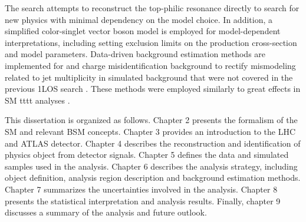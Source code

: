 \documentclass[../thesis.tex]{subfiles}
\begin{document}
The search attempts to reconstruct the top-philic resonance directly to search for new physics with minimal dependency on the model choice. In addition, a simplified color-singlet vector boson model \citep{theory:ttZp} is employed for model-dependent interpretations, including setting exclusion limits on the production cross-section and model parameters. Data-driven background estimation methods are implemented for \ttW and charge misidentification background to rectify mismodeling related to jet multiplicity in simulated background that were not covered in the previous \acs{1LOS} search \citep{theory:ttZp_1los}. These methods were employed similarly to great effects in \acs{SM} \acs{tttt} analyses \citep{tttt_evidence,tttt_obs}.

This dissertation is organized as follows. Chapter 2 presents the formalism of the \acs{SM} and relevant \acs{BSM} concepts. Chapter 3 provides an introduction to the \acs{LHC} and \acs{ATLAS} detector. Chapter 4 describes the reconstruction and identification of physics object from detector signals. Chapter 5 defines the data and simulated samples used in the analysis. Chapter 6 describes the analysis strategy, including object definition, analysis region description and background estimation methods. Chapter 7 summarizes the uncertainties involved in the analysis. Chapter 8 presents the statistical interpretation and analysis results. Finally, chapter 9 discusses a summary of the analysis and future outlook.
\end{document}
